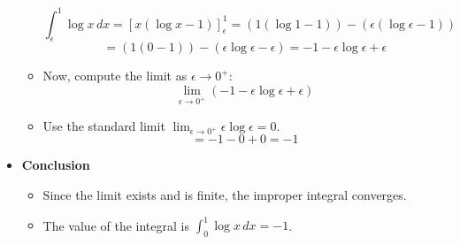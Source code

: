 \begin{cascade}
\begin{itemize}
\begin{itemize}
			            \[ \int_\epsilon^1 \log x \, dx = [x(\log x - 1)]_\epsilon^1 = (1(\log 1 - 1)) - (\epsilon(\log \epsilon - 1)) \]
			            \[ = (1(0 - 1)) - (\epsilon \log \epsilon - \epsilon) = -1 - \epsilon \log \epsilon + \epsilon \]
			      \item Now, compute the limit as $\epsilon \to 0^+$:
			            \[ \lim_{\epsilon \to 0^+} (-1 - \epsilon \log \epsilon + \epsilon) \]
			      \item Use the standard limit $\lim_{\epsilon \to 0^+} \epsilon \log \epsilon = 0$.
			            \[ = -1 - 0 + 0 = -1 \]
		      \end{itemize}
		\item \textbf{Conclusion}
		      \begin{itemize}
			      \item Since the limit exists and is finite, the improper integral converges.
			      \item The value of the integral is $\int_0^1 \log x \, dx = -1$.
		      \end{itemize}
	\end{itemize}
\end{cascade}

\hfill

